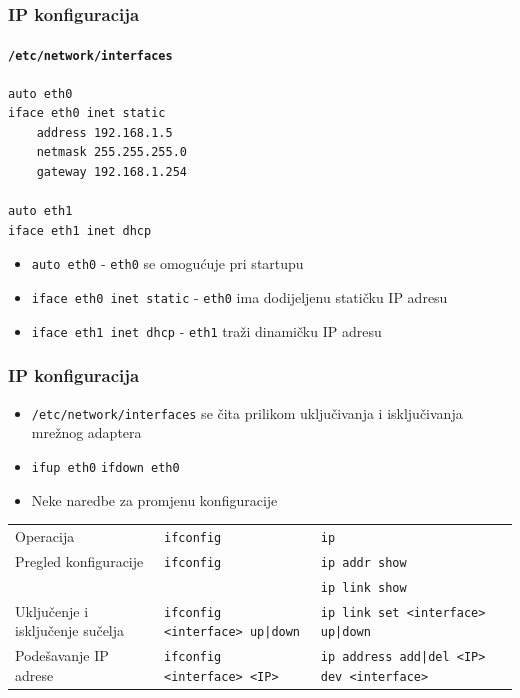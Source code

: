 \documentclass[t,table,usenames,dvipsnames]{beamer}
\begin{document}
\begin{frame}[fragile]
	\frametitle{IP konfiguracija}
	\framesubtitle{\texttt{/etc/network/interfaces}}
	\vspace{-1em}
	\begin{verbatim}
auto eth0
iface eth0 inet static
    address 192.168.1.5
    netmask 255.255.255.0
    gateway 192.168.1.254

auto eth1
iface eth1 inet dhcp
	\end{verbatim}
	\begin{itemize}
		\item \texttt{auto eth0} - \texttt{eth0} se omogućuje pri startupu
		\item \texttt{iface eth0 inet static} - \texttt{eth0} ima dodijeljenu statičku IP adresu
		\item \texttt{iface eth1 inet dhcp} - \texttt{eth1} traži dinamičku IP adresu
	\end{itemize}
\end{frame}

\begin{frame}
	\frametitle{IP konfiguracija}
	\begin{itemize}
		\item \texttt{/etc/network/interfaces} se čita prilikom uključivanja i isključivanja mrežnog adaptera
		\item[] \texttt{ifup eth0} \hspace{2em} \texttt{ifdown eth0}
	\end{itemize}
	\begin{itemize}
		\item Neke naredbe za promjenu konfiguracije
	\end{itemize}
	\begin{table}[h]
		\begin{tabular}{p{4cm} p{3cm} p{3cm}}
			\rowcolor{BlueViolet!20}Operacija & \texttt{ifconfig} & \texttt{ip} \\
			Pregled konfiguracije & \texttt{ifconfig} & \texttt{ip addr show} \\ & & \texttt{ip link show} \\
			Uključenje i isključenje sučelja & \texttt{ifconfig <interface> up|down} & \texttt{ip link set <interface> up|down} \\
			Podešavanje IP adrese & \texttt{ifconfig <interface> <IP>} & \texttt{ip address add|del <IP> dev <interface>}
		\end{tabular}
	\end{table}
\end{frame}
\end{document}
